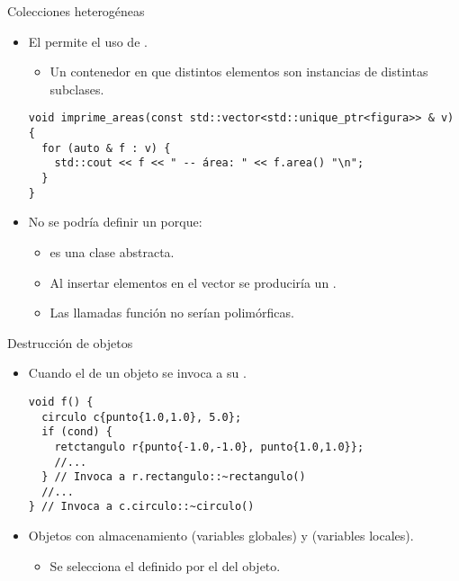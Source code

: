 \begin{frame}[t,fragile]{Colecciones heterogéneas}
\begin{itemize}
  \item El  permite el uso de
        .
    \begin{itemize}
      \item Un contenedor en que distintos elementos son instancias de 
            distintas subclases.
    \end{itemize}
\begin{lstlisting}
void imprime_areas(const std::vector<std::unique_ptr<figura>> & v) {
  for (auto & f : v) {
    std::cout << f << " -- área: " << f.area() "\n";
  }
}
\end{lstlisting}
  
  \item No se podría definir un  porque:
    \begin{itemize}
      \item {} es una clase abstracta.
      \item Al insertar elementos en el vector se produciría un .
      \item Las llamadas función no serían polimórficas.
    \end{itemize}
\end{itemize}
\end{frame}

\begin{frame}[t,fragile]{Destrucción de objetos}
\begin{itemize}
  \item Cuando  el  de un objeto 
        se invoca a su .
\begin{lstlisting}
void f() {
  circulo c{punto{1.0,1.0}, 5.0};
  if (cond) {
    retctangulo r{punto{-1.0,-1.0}, punto{1.0,1.0}};
    //...
  } // Invoca a r.rectangulo::~rectangulo()
  //...
} // Invoca a c.circulo::~circulo()
\end{lstlisting}

  \item Objetos con almacenamiento 
         (variables globales) y
         (variables locales).
    \begin{itemize}
      \item Se selecciona el  
            definido por el  del objeto.
    \end{itemize}
\end{itemize}
\end{frame}

